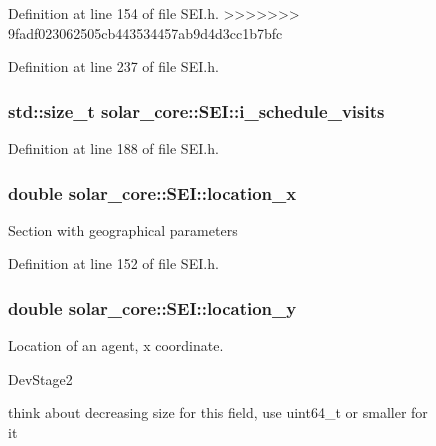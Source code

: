\begin{figure}[H]
\begin{center}
Definition at line 154 of file S\+E\+I.\+h.
>>>>>>> 9fadf023062505cb443534457ab9d4d3cc1b7bfc


Definition at line 237 of file S\+E\+I.\+h.

\hypertarget{classsolar__core_1_1_s_e_i_a3ff238346bd126ee39aa37bfee41be43}{}
\subsubsection[{i\+\_\+schedule\+\_\+visits}]{\setlength{\rightskip}{0pt plus 5cm}std\+::size\+\_\+t solar\+\_\+core\+::\+S\+E\+I\+::i\+\_\+schedule\+\_\+visits\hspace{0.3cm}{\ttfamily [protected]}}\label{classsolar__core_1_1_s_e_i_a3ff238346bd126ee39aa37bfee41be43}


Definition at line 188 of file S\+E\+I.\+h.

\hypertarget{classsolar__core_1_1_s_e_i_a3de17f788667889770edaf7dc0fc054d}{}
\subsubsection[{location\+\_\+x}]{\setlength{\rightskip}{0pt plus 5cm}double solar\+\_\+core\+::\+S\+E\+I\+::location\+\_\+x}\label{classsolar__core_1_1_s_e_i_a3de17f788667889770edaf7dc0fc054d}
Section with geographical parameters 

Definition at line 152 of file S\+E\+I.\+h.

\hypertarget{classsolar__core_1_1_s_e_i_a5fc331197d08788392c3af1903f25763}{}
\subsubsection[{location\+\_\+y}]{\setlength{\rightskip}{0pt plus 5cm}double solar\+\_\+core\+::\+S\+E\+I\+::location\+\_\+y}\label{classsolar__core_1_1_s_e_i_a5fc331197d08788392c3af1903f25763}
Location of an agent, x coordinate.\begin{DoxyRefDesc}{Dev\+Stage2}
\item[\hyperlink{_dev_stage2__DevStage2000019}{Dev\+Stage2}]think about decreasing size for this field, use uint64\+\_\+t or smaller for it \end{DoxyRefDesc}



\end{center}
\end{figure}
